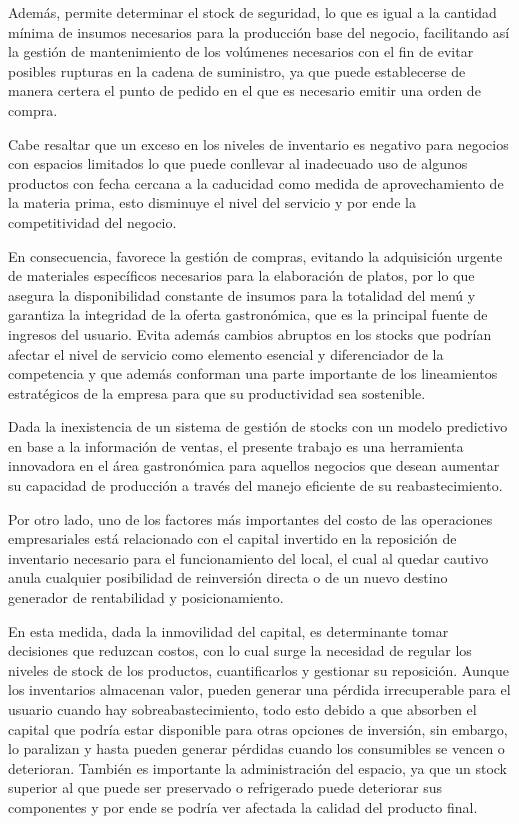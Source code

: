 Además, permite determinar el stock de seguridad, lo que es igual a la cantidad mínima de insumos necesarios para la producción base del negocio, facilitando así la gestión de mantenimiento de los volúmenes necesarios con el fin de evitar posibles rupturas en la cadena de suministro, ya que puede establecerse de manera certera el punto de pedido en el que es necesario emitir una orden de compra. 

Cabe resaltar que un exceso en los niveles de inventario es negativo para negocios con espacios limitados lo que puede conllevar al inadecuado uso de algunos productos con fecha cercana a la caducidad como medida de aprovechamiento de la materia prima, esto disminuye el nivel del servicio y por ende la competitividad del negocio.

En consecuencia, favorece la gestión de compras, evitando la adquisición urgente de materiales específicos necesarios para la elaboración de platos, por lo que asegura la disponibilidad constante de insumos para la totalidad del menú y garantiza la integridad de la oferta gastronómica, que es la principal fuente de ingresos del usuario. Evita además cambios abruptos en los stocks que podrían afectar el nivel de servicio como elemento esencial y diferenciador de la competencia y que además conforman una parte importante de los lineamientos estratégicos de la empresa para que su productividad sea sostenible.  

Dada la inexistencia de un sistema de gestión de stocks con un modelo predictivo en base a la información de ventas, el presente trabajo es una herramienta innovadora en el área gastronómica para aquellos negocios que desean aumentar su capacidad de  producción a través del manejo eficiente de su reabastecimiento.

Por otro lado, uno de los factores más importantes del costo de las operaciones empresariales está relacionado con el capital  invertido en la reposición de inventario necesario para el funcionamiento del local, el cual al quedar cautivo anula cualquier posibilidad de reinversión directa o de un nuevo destino generador de rentabilidad y posicionamiento.

En esta medida, dada la inmovilidad del capital, es determinante tomar decisiones que reduzcan costos, con lo cual surge la necesidad de regular los niveles de stock de los productos, cuantificarlos y gestionar su reposición. Aunque los inventarios almacenan valor, pueden generar una pérdida irrecuperable para el usuario cuando hay sobreabastecimiento, todo esto debido a que absorben el capital que podría estar disponible para otras opciones de inversión, sin embargo, lo paralizan y hasta pueden generar pérdidas cuando los consumibles se vencen o deterioran. También es importante la administración del espacio, ya que un stock superior al que puede ser preservado o refrigerado puede deteriorar sus componentes y por ende se podría ver afectada la calidad del producto final.

